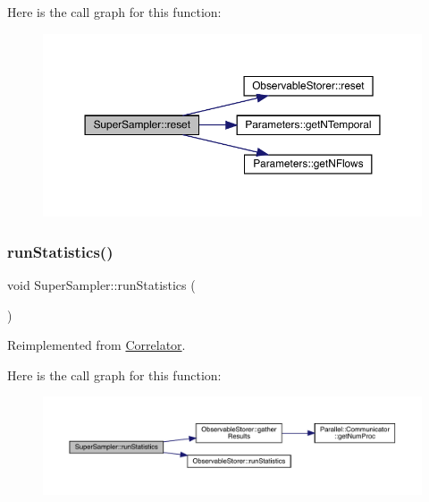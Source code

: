 Here is the call graph for this function\+:\nopagebreak
\begin{figure}[H]
\begin{center}
\leavevmode
\includegraphics[width=350pt]{class_super_sampler_ab2f028561e015500fac1e3093aa4a725_cgraph}
\end{center}
\end{figure}
\mbox{\label{class_super_sampler_af96f7d461e9159adb4eef9bda9c6ecde}} 
\subsubsection{\texorpdfstring{runStatistics()}{runStatistics()}}
{\footnotesize\ttfamily void Super\+Sampler\+::run\+Statistics (\begin{DoxyParamCaption}{ }\end{DoxyParamCaption})\hspace{0.3cm}{\ttfamily [virtual]}}



Reimplemented from \mbox{\hyperlink{class_correlator_a35197b1d12b62ef30b79c0138a26456e}{Correlator}}.

Here is the call graph for this function\+:\nopagebreak
\begin{figure}[H]
\begin{center}
\leavevmode
\includegraphics[width=350pt]{class_super_sampler_af96f7d461e9159adb4eef9bda9c6ecde_cgraph}
\end{center}
\end{figure}
\mbox{\label{class_super_sampler_a410b650ebccdb03519c88908a3a8013e}} 
